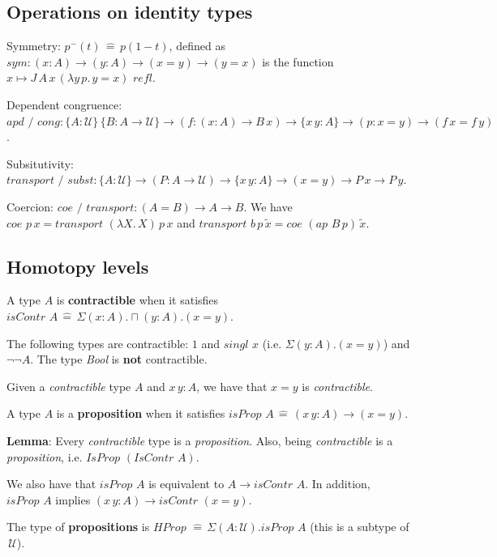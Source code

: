 \documentclass[a4paper]{article}
\begin{document}
\subsection*{Operations on identity types}

Symmetry: $p^-(t) \, \hat{=} \, p(1 - t)$, defined as $sym : (x : A) \to (y : A) \to (x = y) \to (y = x)$ is the function $x \mapsto J \, A \, x \, (\lambda y \, p. \, y = x) \textit{ refl}$.

Dependent congruence: $\textit{apd / cong} : \{A : \mathcal{U}\} \, \{B : A \to \mathcal{U}\} \to (f : (x : A) \to B \, x) \to \{x \, y : A\} \to (p : x = y) \to (f \, x = f \, y)$.

Subsitutivity: $\textit{transport / subst} : \{A : \mathcal{U}\} \to (P : A \to \mathcal{U}) \to \{x \, y : A\} \to (x = y) \to P \, x \to P \, y$.

Coercion: $\textit{coe / transport} : (A = B) \to A \to B$. We have $\textit{coe } p \, x = \textit{transport } (\lambda X. \, X) \, p \, x$ and $\textit{transport } b \, p \, \tilde{x} = \textit{coe } (\textit{ap } B \, p) \, \tilde{x}$.

\subsection*{Homotopy levels}

A type $A$ is \textbf{contractible} when it satisfies $\textit{isContr } A \, \hat{=} \, \Sigma(x : A).\sqcap(y : A).(x = y)$.

The following types are contractible: $1$ and $\textit{singl } x$ (i.e. $\Sigma(y : A).(x = y)$) and $\neg \neg A$. The type \textit{Bool} is \textbf{not} contractible.

Given a \textit{contractible} type $A$ and $x \, y : A$, we have that $x = y$ is \textit{contractible}.

A type $A$ is a \textbf{proposition} when it satisfies $\textit{isProp } A \, \hat{=} \, (x \, y : A) \to (x = y)$.

\textbf{Lemma}: Every \textit{contractible} type is a \textit{proposition}. Also, being \textit{contractible} is a \textit{proposition}, i.e. $\textit{IsProp }(\textit{IsContr } A)$.

We also have that $\textit{isProp } A$ is equivalent to $A \to \textit{isContr } A$. In addition, $\textit{isProp } A$ implies $(x \, y : A) \to \textit{isContr }(x = y)$.

The type of \textbf{propositions} is $\textit{HProp } \hat{=} \, \Sigma(A : \mathcal{U}). \textit{isProp } A$ (this is a subtype of $\, \mathcal{U}$).
\end{document}
